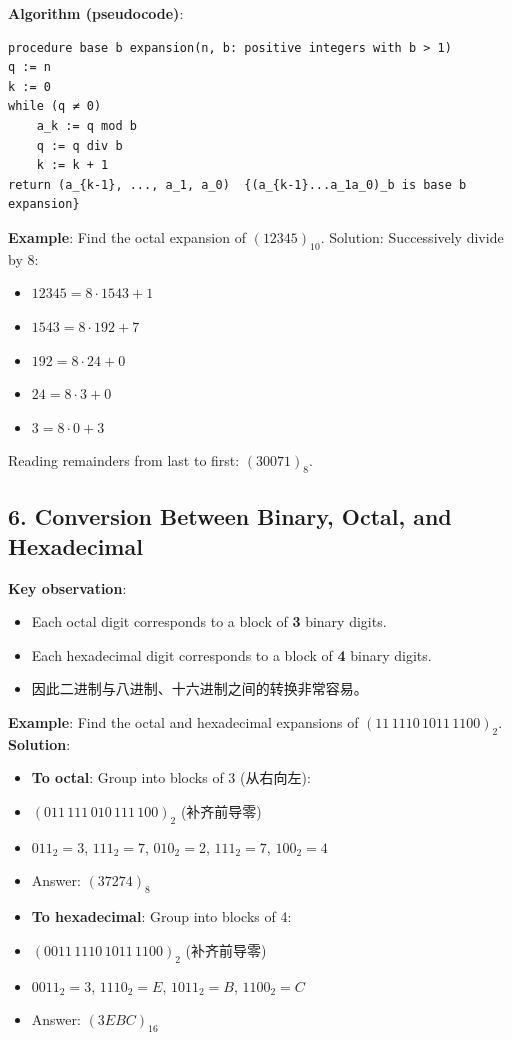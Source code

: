\documentclass[10pt,a4paper,openany]{ctexbook}
\theoremstyle{definition}
\theoremstyle{remark}
\begin{document}
\textbf{Algorithm (pseudocode)}:
{\footnotesize\begin{verbatim}
procedure base b expansion(n, b: positive integers with b > 1)
q := n
k := 0
while (q ≠ 0)
    a_k := q mod b
    q := q div b
    k := k + 1
return (a_{k-1}, ..., a_1, a_0)  {(a_{k-1}...a_1a_0)_b is base b expansion}
\end{verbatim}}

\textbf{Example}: Find the octal expansion of $(12345)_{10}$.
Solution: Successively divide by $8$:
\begin{itemize}
\item $12345 = 8 \cdot 1543 + 1$
\item $1543 = 8 \cdot 192 + 7$
\item $192 = 8 \cdot 24 + 0$
\item $24 = 8 \cdot 3 + 0$
\item $3 = 8 \cdot 0 + 3$

\end{itemize}

Reading remainders from last to first: $(30071)_8$.
\vspace{-2pt}

\subsection{6. Conversion Between Binary, Octal, and Hexadecimal}

\textbf{Key observation}:
\begin{itemize}
\item Each octal digit corresponds to a block of \textbf{3} binary digits.
\item Each hexadecimal digit corresponds to a block of \textbf{4} binary digits.
\item 因此二进制与八进制、十六进制之间的转换非常容易。

\end{itemize}

\textbf{Example}: Find the octal and hexadecimal expansions of $(11\,1110\,1011\,1100)_2$.
\textbf{Solution}:
\begin{itemize}
\item \textbf{To octal}: Group into blocks of 3 (从右向左):
\item $(011\,111\,010\,111\,100)_2$ (补齐前导零)
\item $011_2 = 3$, $111_2 = 7$, $010_2 = 2$, $111_2 = 7$, $100_2 = 4$
\item Answer: $(37274)_8$

\item \textbf{To hexadecimal}: Group into blocks of 4:
\item $(0011\,1110\,1011\,1100)_2$ (补齐前导零)
\item $0011_2 = 3$, $1110_2 = E$, $1011_2 = B$, $1100_2 = C$
\item Answer: $(3EBC)_{16}$

\end{itemize}
\end{document}
